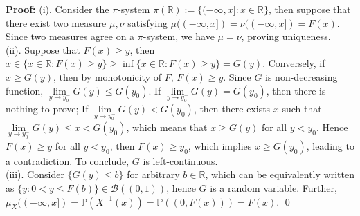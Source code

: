\documentclass[12pt]{article}
\begin{document}
\textbf{Proof:} (i). Consider the $\pi$-system $\pi(\mathbb{R}):=\{(-\infty,x]: x\in\mathbb{R}\}$, then suppose that there exist two measure $\mu,\nu$ satisfying $\mu((-\infty, x])=\nu((-\infty, x])=F(x)$. Since two measures agree on a $\pi$-system, we have $\mu=\nu$, proving uniqueness. \\
\indent (ii). Suppose that $F(x)\geq y$, then $x\in\{x\in\mathbb{R}:F(x)\geq y\}\geq\inf\{x\in\mathbb{R}: F(x)\geq y\}=G(y)$. Conversely, if $x\geq G(y)$, then by monotonicity of $F$, $F(x)\geq y$. Since $G$ is non-decreasing function, $\lim\limits_{y\to y_0^-}G(y)\leq G(y_0)$. If $\lim\limits_{y\to y_0^-}G(y)=G(y_0)$, then there is nothing to prove; If $\lim\limits_{y\to y_0^-}G(y)<G(y_0)$, then there exists $x$ such that $\lim\limits_{y\to y_0^-}G(y)\leq x<G(y_0)$, which means that $x\geq G(y)$ for all $y<y_0$. Hence $F(x)\geq y$ for all $y<y_0$, then $F(x)\geq y_0$, which implies $x\geq G(y_0)$, leading to a contradiction. To conclude, $G$ is left-continuous. \\
\indent (iii). Consider $\{G(y)\leq b\}$ for arbitrary $b\in\mathbb{R}$, which can be equivalently written as $\{y: 0<y\leq F(b)\}\in\mathcal{B}((0,1))$, hence $G$ is a random variable. Further, $\mu_X((-\infty,x])=\mathbb{P}(X^{-1}(x))=\mathbb{P}((0,F(x)))=F(x)$. \qed
\\
\end{document}
